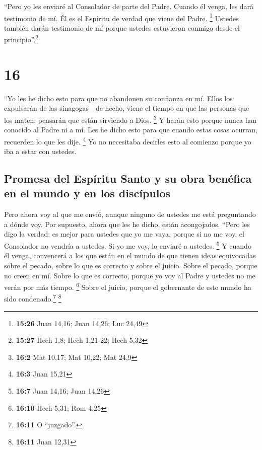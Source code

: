  ``Pero yo les enviaré al Consolador de parte del Padre.
Cuando él venga, les dará testimonio de mí. Él es el Espíritu de verdad
que viene del Padre. \footnote{\textbf{15:26} Juan 14,16; Juan 14,26;
  Luc 24,49}  Ustedes también darán testimonio de mí
porque ustedes estuvieron conmigo desde el principio''.\footnote{\textbf{15:27}
  Hech 1,8; Hech 1,21-22; Hech 5,32}

\hypertarget{section-15}{%
\section{16}\label{section-15}}

 ``Yo les he dicho esto para que no abandonen su confianza
en mí.  Ellos los expulsarán de las sinagogas---de hecho,
viene el tiempo en que las personas que los maten, pensarán que están
sirviendo a Dios. \footnote{\textbf{16:2} Mat 10,17; Mat 10,22; Mat 24,9}
 Y harán esto porque nunca han conocido al Padre ni a mí.
Les he dicho esto para que cuando estas cosas ocurran, recuerden lo que
les dije. \footnote{\textbf{16:3} Juan 15,21}  Yo no
necesitaba decirles esto al comienzo porque yo iba a estar con ustedes.

\hypertarget{promesa-del-espuxedritu-santo-y-su-obra-benuxe9fica-en-el-mundo-y-en-los-discuxedpulos}{%
\subsection{Promesa del Espíritu Santo y su obra benéfica en el mundo y
en los
discípulos}\label{promesa-del-espuxedritu-santo-y-su-obra-benuxe9fica-en-el-mundo-y-en-los-discuxedpulos}}

 Pero ahora voy al que me envió, aunque ninguno de ustedes
me está preguntando a dónde voy.  Por supuesto, ahora que
les he dicho, están acongojados.  ``Pero les digo la
verdad: es mejor para ustedes que yo me vaya, porque si no me voy, el
Consolador no vendría a ustedes. Si yo me voy, lo enviaré a ustedes.
\footnote{\textbf{16:7} Juan 14,16; Juan 14,26}  Y cuando
él venga, convencerá a los que están en el mundo de que tienen ideas
equivocadas sobre el pecado, sobre lo que es correcto y sobre el juicio.
 Sobre el pecado, porque no creen en mí. 
Sobre lo que es correcto, porque yo voy al Padre y ustedes no me verán
por más tiempo. \footnote{\textbf{16:10} Hech 5,31; Rom 4,25}
 Sobre el juicio, porque el gobernante de este mundo ha
sido condenado.\footnote{\textbf{16:11} O ``juzgado''.} \footnote{\textbf{16:11}
  Juan 12,31}

